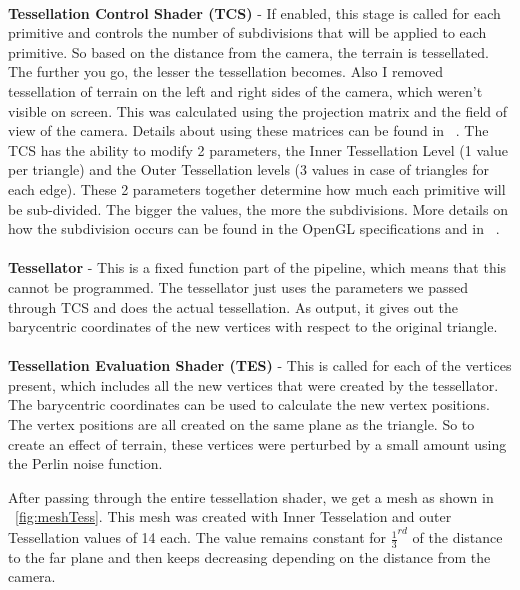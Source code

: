 \documentclass[annual]{acmsiggraph}
\begin{document}
\paragraph*{}
\textbf{Tessellation Control Shader (TCS)} - If enabled, this stage is called for each primitive and controls the number of subdivisions that will be applied to each primitive. So based on the distance from the camera, the terrain is tessellated. The further you go, the lesser the tessellation becomes. Also I removed tessellation of terrain on the left and right sides of the camera, which weren't visible on screen. This was calculated using the projection matrix and the field of view of the camera. Details about using these matrices can be found in ~\cite{RealTime:2008}. The TCS has the ability to modify 2 parameters, the Inner Tessellation Level (1 value per triangle) and the Outer Tessellation levels (3 values in case of triangles for each edge). These 2 parameters together determine how much each primitive will be sub-divided. The bigger the values, the more the subdivisions. More details on how the subdivision occurs can be found in the OpenGL specifications and in ~\cite{openglInsights:2012}.

\paragraph*{}
\textbf{Tessellator\textit{}} - This is a fixed function part of the pipeline, which means that this cannot be programmed. The tessellator just uses the parameters we passed through TCS and does the actual tessellation. As output, it gives out the barycentric coordinates of the new vertices with respect to the original triangle.

\paragraph*{}
\textbf{Tessellation Evaluation Shader (TES)} - This is called for each of the vertices present, which includes all the new vertices that were created by the tessellator. The barycentric coordinates can be used to calculate the new vertex positions. The vertex positions are all created on the same plane as the triangle. So to create an effect of terrain, these vertices were perturbed by a small amount using the Perlin noise function.

After passing through the entire tessellation shader, we get a mesh as shown in ~\ref{fig:meshTess}. This mesh was created with Inner Tesselation and outer Tessellation values of 14 each. The value remains constant for \begin{math}
\frac{1}{3}^{rd}
\end{math} of the distance to the far plane and then keeps decreasing depending on the distance from the camera.
\end{document}

